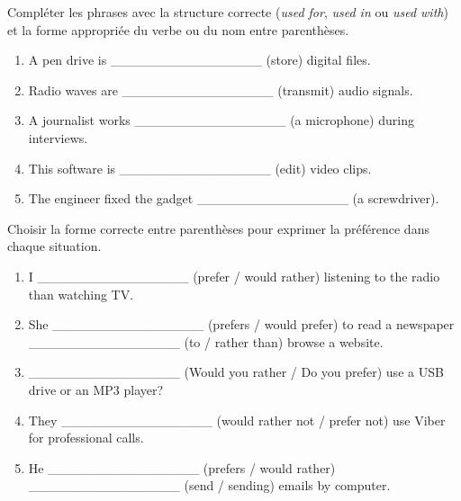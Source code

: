 \documentclass[11pt]{article}
\begin{document}
\begin{exercice}
Compléter les phrases avec la structure correcte (\textit{used for}, \textit{used in} ou \textit{used with}) et la forme appropriée du verbe ou du nom entre parenthèses.
\begin{enumerate}
\item A pen drive is \_\_\_\_\_\_\_\_\_\_\_\_\_\_\_\_ (store) digital files.
\item Radio waves are \_\_\_\_\_\_\_\_\_\_\_\_\_\_\_\_ (transmit) audio signals.
\item A journalist works \_\_\_\_\_\_\_\_\_\_\_\_\_\_\_\_ (a microphone) during interviews.
\item This software is \_\_\_\_\_\_\_\_\_\_\_\_\_\_\_\_ (edit) video clips.
\item The engineer fixed the gadget \_\_\_\_\_\_\_\_\_\_\_\_\_\_\_\_ (a screwdriver).
\end{enumerate}
\end{exercice}

\begin{exercice}
Choisir la forme correcte entre parenthèses pour exprimer la préférence dans chaque situation.
\begin{enumerate}
\item I \_\_\_\_\_\_\_\_\_\_\_\_\_\_\_\_ (prefer / would rather) listening to the radio than watching TV.
\item She \_\_\_\_\_\_\_\_\_\_\_\_\_\_\_\_ (prefers / would prefer) to read a newspaper \_\_\_\_\_\_\_\_\_\_\_\_\_\_\_\_ (to / rather than) browse a website.
\item \_\_\_\_\_\_\_\_\_\_\_\_\_\_\_\_ (Would you rather / Do you prefer) use a USB drive or an MP3 player?
\item They \_\_\_\_\_\_\_\_\_\_\_\_\_\_\_\_ (would rather not / prefer not) use Viber for professional calls.
\item He \_\_\_\_\_\_\_\_\_\_\_\_\_\_\_\_ (prefers / would rather) \_\_\_\_\_\_\_\_\_\_\_\_\_\_\_\_ (send / sending) emails by computer.
\end{enumerate}
\end{exercice}
\end{document}
